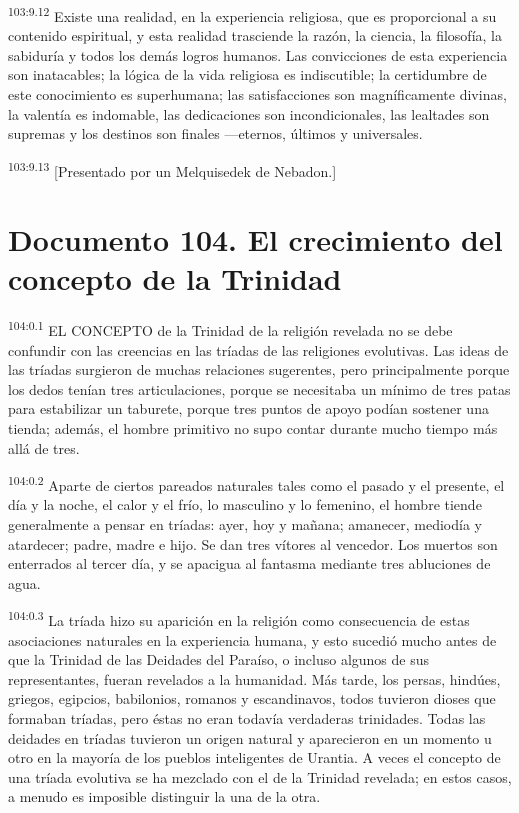 \documentclass[twoside, 11pt]{book}
\begin{document}
\par
\textsuperscript{103:9.12} Existe una realidad, en la experiencia religiosa, que es proporcional a su contenido espiritual, y esta realidad trasciende la razón, la ciencia, la filosofía, la sabiduría y todos los demás logros humanos. Las convicciones de esta experiencia son inatacables; la lógica de la vida religiosa es indiscutible; la certidumbre de este conocimiento es superhumana; las satisfacciones son magníficamente divinas, la valentía es indomable, las dedicaciones son incondicionales, las lealtades son supremas y los destinos son finales ---eternos, últimos y universales.

\par
\textsuperscript{103:9.13} [Presentado por un Melquisedek de Nebadon.]


\chapter{Documento 104. El crecimiento del concepto de la Trinidad}
\par
\textsuperscript{104:0.1} EL CONCEPTO de la Trinidad de la religión revelada no se debe confundir con las creencias en las tríadas de las religiones evolutivas. Las ideas de las tríadas surgieron de muchas relaciones sugerentes, pero principalmente porque los dedos tenían tres articulaciones, porque se necesitaba un mínimo de tres patas para estabilizar un taburete, porque tres puntos de apoyo podían sostener una tienda; además, el hombre primitivo no supo contar durante mucho tiempo más allá de tres.

\par
\textsuperscript{104:0.2} Aparte de ciertos pareados naturales tales como el pasado y el presente, el día y la noche, el calor y el frío, lo masculino y lo femenino, el hombre tiende generalmente a pensar en tríadas: ayer, hoy y mañana; amanecer, mediodía y atardecer; padre, madre e hijo. Se dan tres vítores al vencedor. Los muertos son enterrados al tercer día, y se apacigua al fantasma mediante tres abluciones de agua.

\par
\textsuperscript{104:0.3} La tríada hizo su aparición en la religión como consecuencia de estas asociaciones naturales en la experiencia humana, y esto sucedió mucho antes de que la Trinidad de las Deidades del Paraíso, o incluso algunos de sus representantes, fueran revelados a la humanidad. Más tarde, los persas, hindúes, griegos, egipcios, babilonios, romanos y escandinavos, todos tuvieron dioses que formaban tríadas, pero éstas no eran todavía verdaderas trinidades. Todas las deidades en tríadas tuvieron un origen natural y aparecieron en un momento u otro en la mayoría de los pueblos inteligentes de Urantia. A veces el concepto de una tríada evolutiva se ha mezclado con el de la Trinidad revelada; en estos casos, a menudo es imposible distinguir la una de la otra.
\end{document}
